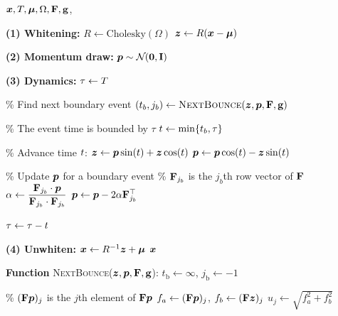 	\singlespacing
	\begin{minipage}[t]{0.49\textwidth}
		\begin{algorithm}[H]
			\caption{\hhmc for MTNs}
			\label{alg:hhmc}
			\begin{algorithmic}[1]
				\REQUIRE $ \bm{x}, T,  \bm{\mu} ,  \Omega, \mathbf{F}, \mathbf{g}$, 

				\textbf{(1) Whitening:}
				\STATE \( R \gets \text{Cholesky}(\Omega) \)
				\STATE \( \bm{z} \gets R(\bm{x} - \bm{\mu}) \)
				\spacersmall

				\textbf{(2) Momentum draw:}
				\STATE $ \bm{p} \sim {\cal N}\hspace{-0.25em}\left( \bm{0}, \mathbf{I}\right) $
				\spacersmall

				\textbf{(3) Dynamics:}
				\STATE $ \tau \gets T $ 
				\spacersmall

				\spacersmall

				\STATE \% Find next boundary event
				\STATE $(t_b, j_b) \gets \textsc{NextBounce}(\bm{z}, \bm{p}, \mathbf{F}, \mathbf{g})$
				\spacersmall

				\STATE \% The event time is bounded by $ \tau $
				\STATE $ t \gets \min \{t_b, \tau\} $ 
				\spacersmall

				\STATE \% Advance time $ t $: 
				\STATE $ \bm{z} \gets \bm{p} \sin(t) + \bm{z} \cos(t) $
				\STATE $ \bm{p} \gets \bm{p} \cos(t) - \bm{z} \sin(t) $
				\spacersmall

				\STATE \% Update $ \bm{p} $ for a boundary event
				\STATE \% $ \mathbf{F}_{j_b} $ is the $ j_b $th row vector of $ \mathbf{F} $
				\STATE $\alpha \gets \dfrac{\mathbf{F}_{j_b} \cdot \bm{p}}{\mathbf{F}_{j_b} \cdot \mathbf{F}_{j_b}}$
				\STATE $\bm{p} \gets \bm{p} - 2\alpha \mathbf{F}_{j_b}^\top$
				\ENDIF

				\STATE $ \tau \gets \tau - t $
				\spacersmall

				\ENDWHILE
				\spacersmall

				\textbf{(4) Unwhiten:}
				\STATE $ \bm{x} \gets R^{-1}\bm{z} + \bm{\mu} $
				\RETURN $ \bm{x} $
				\spacersmall

				\textbf{Function} \textsc{NextBounce}($ \bm{z}, \bm{p}, \mathbf{F}, \mathbf{g} $):
				\STATE $t_{\text{b}} \gets \infty$, $j_{\text{b}} \gets -1$
				\spacersmall

				\STATE \% $ (\mathbf{F} \bm{p})_j $ is the $j$th element of $ \mathbf{F} \bm{p} $
				\STATE $f_a \gets  (\mathbf{F} \bm{p})_j$, $f_b \gets  (\mathbf{F} \bm{z})_j$
				\spacersmall
				\STATE $u_j \gets \sqrt{f_a^2 + f_b^2}$
				\spacersmall


\end{algorithmic}
\end{algorithm}
\end{minipage}
